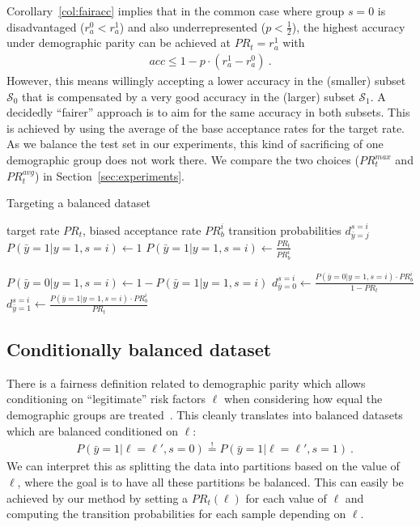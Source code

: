 Corollary~\ref{col:fairacc} implies that
in the common case where group $s=0$ is disadvantaged ($r_a^0 < r_a^1$) and also underrepresented ($p<\tfrac{1}{2}$),
the highest accuracy under demographic parity can be achieved at $\mathit{PR}_t=r_a^1$ with
\begin{align}
  \mathit{acc} \leq 1 - p\cdot\left( r^1_a -r^0_a \right)~.
\end{align}
However, this means willingly accepting a lower accuracy in the (smaller) subset $\mathcal{S}_0$
that is compensated by a very good accuracy in the (larger) subset $\mathcal{S}_1$.
A decidedly ``fairer'' approach is to aim for the same accuracy in both subsets.
This is achieved by using the average of the base acceptance rates for the target rate.
As we balance the test set in our experiments, this kind of sacrificing of one demographic group does not work there.
We compare the two choices ($\mathit{PR}_t^{max}$ and $\mathit{PR}_t^{avg}$) in Section~\ref{sec:experiments}.

\begin{algorithm}[t]
  \caption{Targeting a balanced dataset}%
  \label{alg:parity}
  \begin{algorithmic}[1]
    \REQUIRE target rate $\mathit{PR}_t$,  biased acceptance rate $\mathit{PR}_b^i$
    \ENSURE transition probabilities $d^{s=i}_{\bar{y}=j}$
    \STATE $P(\bar{y}=1|y=1,s=i) \gets 1$
    \ELSE
    \STATE $P(\bar{y}=1|y=1,s=i) \gets \frac{\mathit{PR}_t}{\mathit{PR}_b^i}$
    \ENDIF

    \STATE $P(\bar{y}=0|y=1,s=i) \gets 1 - P(\bar{y}=1|y=1,s=i)$
    \STATE $d^{s=i}_{\bar{y}=0} \gets \frac{P(\bar{y}=0|y=1,s=i)\cdot \mathit{PR}_b^i}{1 - \mathit{PR}_t}$
    \STATE $d^{s=i}_{\bar{y}=1} \gets \frac{P(\bar{y}=1|y=1,s=i)\cdot \mathit{PR}_b^i}{\mathit{PR}_t}$
    \ENDIF
  \end{algorithmic}
\end{algorithm}

\subsection{Conditionally balanced dataset}
\noindent There is a fairness definition related to demographic parity which allows conditioning on ``legitimate'' risk factors $\ell$
when considering how equal the demographic groups are treated~\citep{corbett2017algorithmic}.
This cleanly translates into balanced datasets which are balanced conditioned on $\ell$:
\begin{align}
  &P(\bar{y}=1|\ell=\ell\prime, s=0) \overset{!}{=} P(\bar{y}=1|\ell=\ell\prime, s=1)~.
\end{align}
We can interpret this as splitting the data into partitions based on the value of $\ell$,
where the goal is to have all these partitions be balanced.
This can easily be achieved by our method by setting a $\mathit{PR}_t(\ell)$ for each value of $\ell$
and computing the transition probabilities for each sample depending on $\ell$.

